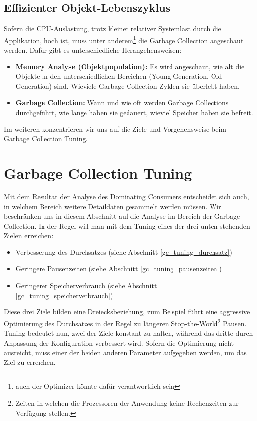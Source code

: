 \subsection{Effizienter Objekt-Lebenszyklus}
Sofern die CPU-Auslastung, trotz kleiner relativer Systemlast durch die Applikation, hoch ist, muss unter anderem\footnote{auch der Optimizer könnte dafür verantwortlich sein} die Garbage Collection angeschaut werden. Dafür gibt es unterschiedliche Herangehensweisen:
\begin{itemize}
\item \textbf{Memory Analyse (Objektpopulation): }Es wird angeschaut, wie alt die Objekte in den unterschiedlichen Bereichen (Young Generation, Old Generation) sind. Wieviele Garbage Collection Zyklen sie überlebt haben.
\item \textbf{Garbage Collection: }Wann und wie oft werden Garbage Collections durchgeführt, wie lange haben sie gedauert, wieviel Speicher haben sie befreit.
\end{itemize}
Im weiteren konzentrieren wir uns auf die Ziele und Vorgehensweise beim Garbage Collection Tuning.

\section{Garbage Collection Tuning}\label{garbage_collection_tuning}
Mit dem Resultat der Analyse des Dominating Consumers entscheidet sich auch, in welchem Bereich weitere Detaildaten gesammelt werden müssen. Wir beschränken uns in diesem Abschnitt auf die Analyse im Bereich der Garbage Collection. In der Regel will man mit dem Tuning eines der drei unten stehenden Zielen erreichen\cite{langerkreftJavaCore}: 
\begin{itemize}
\item Verbesserung des Durchsatzes (siehe Abschnitt \ref{gc_tuning_durchsatz})
\item Geringere Pausenzeiten (siehe Abschnitt \ref{gc_tuning_pausenzeiten})
\item Geringerer Speicherverbrauch (siehe Abschnitt \ref{gc_tuning_speicherverbrauch})
\end{itemize}

Diese drei Ziele bilden eine Dreiecksbeziehung, zum Beispiel führt eine aggressive Optimierung des Durchsatzes in der Regel zu längeren Stop-the-World\footnote{Zeiten in welchen die Prozessoren der Anwendung keine Rechenzeiten zur Verfügung stellen.} Pausen. Tuning bedeutet nun, zwei der Ziele konstant zu halten, während das dritte durch Anpassung der Konfiguration verbessert wird. Sofern die Optimierung nicht ausreicht, muss einer der beiden anderen Parameter aufgegeben werden, um das Ziel zu erreichen.


